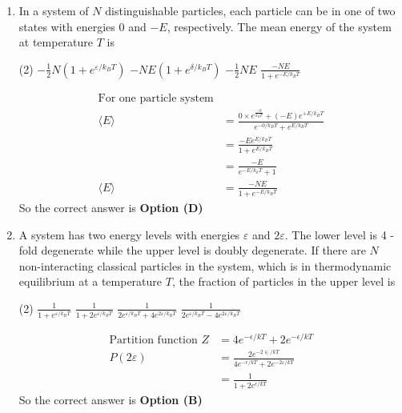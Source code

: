 \begin{enumerate}
	\item In a system of $N$ distinguishable particles, each particle can be in one of two states with energies 0 and $-E$, respectively. The mean energy of the system at temperature $T$ is
\begin{tasks}(2)
\task[\textbf{A.}] $-\frac{1}{2} N\left(1+e^{\varepsilon / k_{B} T}\right)$
\task[\textbf{B.}] $-N E\left(1+e^{\delta / k_{B} T}\right)$
\task[\textbf{C.}] $-\frac{1}{2} N E$
\task[\textbf{D.}] $\frac{-N E}{1+e^{-E / k_{B} T}}$
\end{tasks}
\begin{answer}
$$\begin{aligned}	
\text{For one particle system}&\\
\langle E\rangle&=\frac{0 \times e^{\frac{-0}{k_{B} T}}+(-E) e^{+E / k_{B} T}}{e^{-0 / k_{B} T}+e^{E / k_{B} T}}\\&=\frac{-E e^{E / k_{B} T}}{1+e^{E / k_{B} T}}\\&=\frac{-E}{e^{-E / k_{k} T}+1}\\ \langle E\rangle&=\frac{-N E}{1+e^{-E / k_{B} T}}
\end{aligned}$$	
So the correct answer is \textbf{Option (D)}
\end{answer}
	

\item 	A system has two energy levels with energies $\varepsilon$ and $2 \varepsilon .$ The lower level is 4 -fold degenerate while the upper level is doubly degenerate. If there are $N$ non-interacting classical particles in the system, which is in thermodynamic equilibrium at a temperature $T$, the fraction of particles in the upper level is
\begin{tasks}(2)
\task[\textbf{A.}] $\frac{1}{1+e^{\varepsilon / k_{B} T}}$
\task[\textbf{B.}] $\frac{1}{1+2 e^{\varepsilon / k_{B} T}}$
\task[\textbf{C.}] $\frac{1}{2 e^{\varepsilon / k_{B} T}+4 e^{2 \varepsilon / k_{B} T}}$
\task[\textbf{D.}] $\frac{1}{2 e^{\varepsilon / k_{B} T}-4 e^{2 \varepsilon / k_{B} T}}$
\end{tasks}
\begin{answer}
$$\begin{aligned}	
\text{Partition function }Z&=4 e^{-\epsilon / k T}+2 e^{-\epsilon / k T} \\
 P(2 \varepsilon)&=\frac{2 e^{-2 \in / k T}}{4 e^{-\epsilon / k T}+2 e^{-2 \varepsilon / k T}}\\&=\frac{1}{1+2 e^{\epsilon / k T}}
\end{aligned}$$	
So the correct answer is \textbf{Option (B)}
\end{answer}


\end{enumerate}

